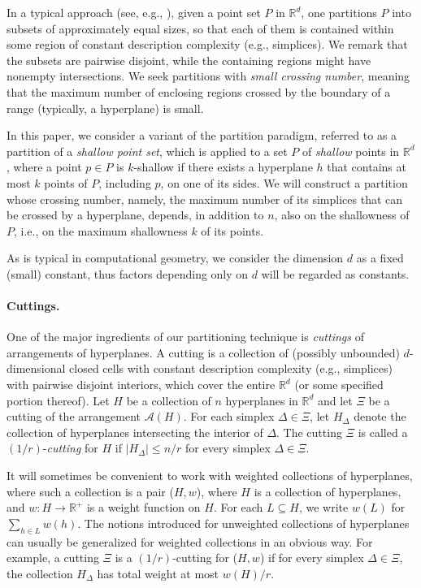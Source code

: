 \documentclass[11pt]{article}
\def\reals{\mathbb R}
\begin{document}
In a typical approach (see, e.g., \cite{mat92a}), given a point set $P$ in $\reals^{d}$, one partitions $P$ into subsets of approximately equal sizes, so
that each of them is contained within some region of constant description complexity (e.g., simplices). We remark that the subsets are pairwise disjoint,
while the containing regions might have nonempty intersections. We seek partitions with {\em small crossing number}, meaning that the maximum number of
enclosing regions crossed by the boundary of a range (typically, a hyperplane) is small.

In this paper, we consider a variant of the partition paradigm, referred to as a partition of a {\em shallow point set}, which is applied to a set $P$ of
{\em shallow} points in $\reals^{d}$, where a point $p \in P$ is $k$-shallow if there exists a hyperplane $h$ that contains at most $k$ points of $P$,
including $p$, on one of its sides. We will construct a partition whose crossing number, namely, the maximum number of its simplices that can be crossed by
a hyperplane, depends, in addition to $n$, also on the shallowness of $P$, i.e., on the maximum shallowness $k$ of its points.

As is typical in computational geometry, we consider the dimension $d$ as a fixed (small) constant, thus factors depending only on $d$ will be regarded as constants.


\paragraph{Cuttings.}
One of the major ingredients of our partitioning technique is {\em cuttings} of arrangements of hyperplanes. A cutting is a collection of (possibly
unbounded) $d$-dimensional closed cells with constant description complexity (e.g., simplices) with pairwise disjoint interiors, which cover the entire
$\reals^{d}$ (or some specified portion thereof). Let $H$ be a collection of $n$ hyperplanes in $\reals^{d}$ and let $\Xi$ be a cutting of the arrangement
$\mathcal{A}(H)$. For each simplex $\Delta \in \Xi$, let $H_{\Delta}$ denote the collection of hyperplanes intersecting the interior of $\Delta$. The
cutting $\Xi$ is called a $(1/r)$-{\em cutting} for $H$ if $|H_{\Delta}| \leq n/r$ for every simplex $\Delta \in \Xi$.

It will sometimes be convenient to work with weighted collections of hyperplanes, where such a collection is a pair ($H,w$), where $H$ is a collection of
hyperplanes, and $w:H \rightarrow \reals^{+}$ is a weight function on $H$. For each $L \subseteq H$, we write $w(L)$ for $\sum_{h \in L} w(h)$. The notions
introduced for unweighted collections of hyperplanes can usually be generalized for weighted collections in an obvious way. For example, a cutting $\Xi$ is
a $(1/r)$-cutting for ($H,w$) if for every simplex $\Delta \in \Xi$, the collection $H_{\Delta}$ has total weight at most $w(H)/r$.
\end{document}
